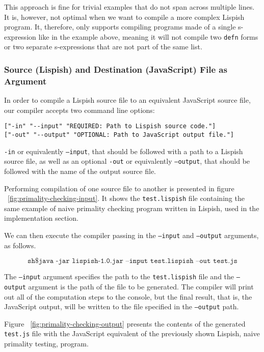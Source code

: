 This approach is fine for trivial examples that do not span across multiple lines. It is, however, not optimal when we want to compile a more complex Lispish program.
It, therefore, only supports compiling programs made of a single s-expression like in the example above, meaning it will not compile two \texttt{defn} forms or two separate s-expressions that are not part of the same list. 

\subsubsection{Source (Lispish) and Destination (JavaScript) File as Argument}

In order to compile a Lispish source file to an equivalent JavaScript source file, our compiler accepts two command line options:

\begin{verbatim}
["-in" "--input" "REQUIRED: Path to Lispish source code."]
["-out" "--output" "OPTIONAL: Path to JavaScript output file."]
\end{verbatim}

\texttt{-in} or equivalently \texttt{--input}, that should be followed with a path to a Lispish source file, as well as an optional 
\texttt{-out} or equivalently \texttt{--output}, that should be followed with the name of the output source file. 

Performing compilation of one source file to another is presented in figure ~\ref{fig:primality-checking-input}. It shows the \texttt{test.lispish} file containing the same example of naive primality checking program written in Lispish, used in the implementation section. 

We can then execute the compiler passing in the \texttt{--input} and \texttt{--output} arguments, as follows.

$$ \texttt{sh\$ java -jar lispish-1.0.jar --input test.lispish --out test.js} $$

The \texttt{--input} argument specifies the path to the \texttt{test.lispish} file and the \texttt{--output} argument is the path of the file to be generated.
The compiler will print out all of the computation steps to the console, but the final result, that is, the JavaScript output, will be written to the file specified in the \texttt{--output} path.

Figure ~\ref{fig:primality-checking-output} presents the contents of the generated \texttt{test.js} file with the JavaScript equivalent of the previously shown Lispish, naive primality testing, program. 


